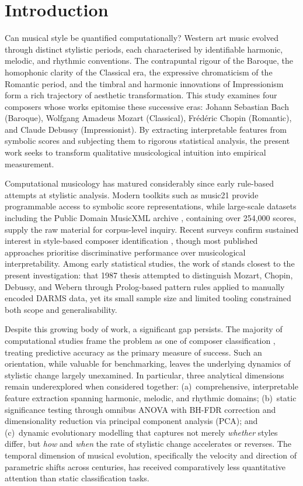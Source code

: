\documentclass[]{interact}
\newif\ifdraftversion
\theoremstyle{plain}
\theoremstyle{definition}
\theoremstyle{remark}
\begin{document}
\ifdraftversion
  \listoftodos
  \clearpage
\fi

\section{Introduction}

Can musical style be quantified computationally? Western art music evolved through
distinct stylistic periods, each characterised by identifiable harmonic, melodic, and
rhythmic conventions. The contrapuntal rigour of the Baroque, the homophonic clarity of
the Classical era, the expressive chromaticism of the Romantic period, and the timbral and harmonic innovations of Impressionism form a rich trajectory of aesthetic transformation.
This study examines four composers whose works epitomise these successive eras:
Johann Sebastian Bach (Baroque), Wolfgang Amadeus Mozart (Classical),
Fr\'ed\'eric Chopin (Romantic), and Claude Debussy (Impressionist). By extracting
interpretable features from symbolic scores and subjecting them to rigorous statistical
analysis, the present work seeks to transform qualitative musicological intuition into
empirical measurement.

Computational musicology has matured considerably since early rule-based attempts at
stylistic analysis. Modern toolkits such as music21 \citep{Cuthbert2010} provide
programmable access to symbolic score representations, while large-scale datasets
including the Public Domain MusicXML archive \citep[PDMX;][]{PDMX2024}, containing over
254,000 scores, supply the raw material for corpus-level inquiry. Recent surveys confirm
sustained interest in style-based composer identification \citep{Simonetta2025}, though
most published approaches prioritise discriminative performance over musicological
interpretability. Among early statistical studies, the work of
\citet{LinJeng1987} stands closest to the present investigation: that 1987 thesis
attempted to distinguish Mozart, Chopin, Debussy, and Webern through Prolog-based pattern
rules applied to manually encoded DARMS data, yet its small sample size and limited
tooling constrained both scope and generalisability.

Despite this growing body of work, a significant gap persists. The majority of
computational studies frame the problem as one of composer classification \citep{Herremans2015}, treating
predictive accuracy as the primary measure of success. Such an orientation, while
valuable for benchmarking, leaves the underlying dynamics of stylistic change largely
unexamined. In particular, three analytical dimensions remain underexplored when
considered together: (a)~comprehensive, interpretable feature extraction spanning
harmonic, melodic, and rhythmic domains; (b)~static significance testing through omnibus
ANOVA with BH-FDR correction and dimensionality reduction via principal
component analysis (PCA); and (c)~dynamic evolutionary modelling that captures not
merely \emph{whether} styles differ, but \emph{how} and \emph{when} the rate of
stylistic change accelerates or reverses. The temporal dimension of musical
evolution, specifically the velocity and direction of parametric shifts across
centuries, has received comparatively less quantitative attention than static classification tasks.
\end{document}
